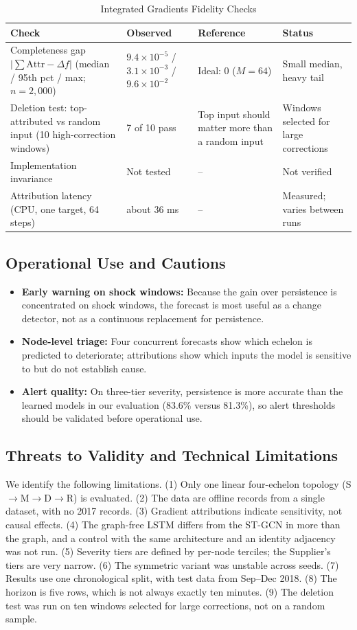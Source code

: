 \documentclass[conference]{IEEEtran}
\begin{document}
\begin{table}[t]
\caption{Integrated Gradients Fidelity Checks}
\label{tab:ig}
\centering
\footnotesize
\begin{tabular}{@{}p{2.6cm}p{1.9cm}p{1.4cm}p{1.2cm}@{}}
\toprule
Check & Observed & Reference & Status \\
\midrule
Completeness gap $|\sum\mathrm{Attr}-\Delta f|$ (median / 95th pct / max; $n=2{,}000$) & $9.4\times10^{-5}$ / $3.1\times10^{-3}$ / $9.6\times10^{-2}$ & Ideal: 0 ($M=64$) & Small median, heavy tail \\
Deletion test: top-attributed vs random input (10 high-correction windows) & 7 of 10 pass & Top input should matter more than a random input & Windows selected for large corrections \\
Implementation invariance & Not tested & -- & Not verified \\
Attribution latency (CPU, one target, 64 steps) & about 36 ms & -- & Measured; varies between runs \\
\bottomrule
\end{tabular}
\end{table}

\subsection{Operational Use and Cautions}
\begin{itemize}
\item \textbf{Early warning on shock windows:} Because the gain over persistence is concentrated on shock windows, the forecast is most useful as a change detector, not as a continuous replacement for persistence.
\item \textbf{Node-level triage:} Four concurrent forecasts show which echelon is predicted to deteriorate; attributions show which inputs the model is sensitive to but do not establish cause.
\item \textbf{Alert quality:} On three-tier severity, persistence is more accurate than the learned models in our evaluation (83.6\% versus 81.3\%), so alert thresholds should be validated before operational use.
\end{itemize}

\subsection{Threats to Validity and Technical Limitations}
We identify the following limitations. (1) Only one linear four-echelon topology (S$\to$M$\to$D$\to$R) is evaluated. (2) The data are offline records from a single dataset, with no 2017 records. (3) Gradient attributions indicate sensitivity, not causal effects. (4) The graph-free LSTM differs from the ST-GCN in more than the graph, and a control with the same architecture and an identity adjacency was not run. (5) Severity tiers are defined by per-node terciles; the Supplier's tiers are very narrow. (6) The symmetric variant was unstable across seeds. (7) Results use one chronological split, with test data from Sep--Dec 2018. (8) The horizon is five rows, which is not always exactly ten minutes. (9) The deletion test was run on ten windows selected for large corrections, not on a random sample.
\end{document}
